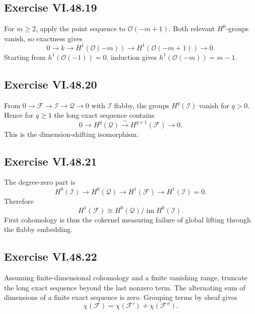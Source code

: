 \subsection*{Exercise VI.48.19}
\begin{solution}
For \(m\ge2\), apply the point sequence to \(\mathcal O(-m+1)\).  Both relevant \(H^0\)-groups vanish, so exactness gives
\[
0\to k\to H^1(\mathcal O(-m))\to H^1(\mathcal O(-m+1))\to0.
\]
Starting from \(h^1(\mathcal O(-1))=0\), induction gives \(h^1(\mathcal O(-m))=m-1\).
\end{solution}

\subsection*{Exercise VI.48.20}
\begin{solution}
From \(0\to\mathcal F\to\mathcal I\to\mathcal Q\to0\) with \(\mathcal I\) flabby, the groups \(H^q(\mathcal I)\) vanish for \(q>0\).  Hence for \(q\ge1\) the long exact sequence contains
\[
0\to H^q(\mathcal Q)\xrightarrow{\sim}H^{q+1}(\mathcal F)\to0.
\]
This is the dimension-shifting isomorphism.
\end{solution}

\subsection*{Exercise VI.48.21}
\begin{solution}
The degree-zero part is
\[
H^0(\mathcal I)\to H^0(\mathcal Q)\to H^1(\mathcal F)\to H^1(\mathcal I)=0.
\]
Therefore
\[
H^1(\mathcal F)\cong H^0(\mathcal Q)/\operatorname{im}H^0(\mathcal I).
\]
First cohomology is thus the cokernel measuring failure of global lifting through the flabby embedding.
\end{solution}

\subsection*{Exercise VI.48.22}
\begin{solution}
Assuming finite-dimensional cohomology and a finite vanishing range, truncate the long exact sequence beyond the last nonzero term.  The alternating sum of dimensions of a finite exact sequence is zero.  Grouping terms by sheaf gives
\[
\chi(\mathcal F)=\chi(\mathcal F')+\chi(\mathcal F'').
\]
\end{solution}

